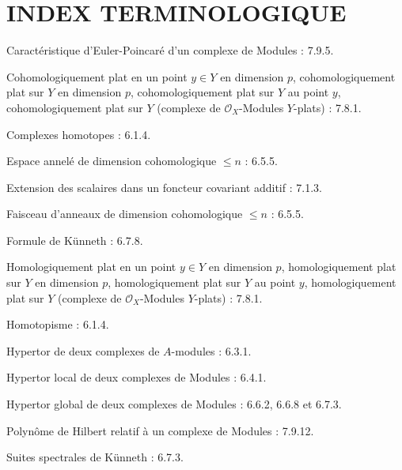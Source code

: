 \section*{INDEX TERMINOLOGIQUE}

\begin{flushleft}
Caractéristique d'Euler-Poincaré d'un complexe de Modules : 7.9.5.

\medskip
Cohomologiquement plat en un point $y\in Y$ en dimension $p$,
cohomologiquement plat sur $Y$ en dimension $p$, cohomologiquement plat sur
$Y$ au point $y$, cohomologiquement plat sur $Y$ (complexe de
$\mathscr O_X$-Modules $Y$-plats) : 7.8.1.

\medskip
Complexes homotopes : 6.1.4.

\medskip
Espace annelé de dimension cohomologique $\leq n$ : 6.5.5.

\medskip
Extension des scalaires dans un foncteur covariant additif : 7.1.3.

\medskip
Faisceau d'anneaux de dimension cohomologique $\leq n$ : 6.5.5.

\medskip
Formule de Künneth : 6.7.8.

\medskip
Homologiquement plat en un point $y\in Y$ en dimension $p$,
homologiquement plat sur $Y$ en dimension $p$, homologiquement plat sur $Y$
au point $y$, homologiquement plat sur $Y$ (complexe de $\mathscr O_X$-Modules
$Y$-plats) : 7.8.1.

\medskip
Homotopisme : 6.1.4.

\medskip
Hypertor de deux complexes de $A$-modules : 6.3.1.

\medskip
Hypertor local de deux complexes de Modules : 6.4.1.

\medskip
Hypertor global de deux complexes de Modules : 6.6.2, 6.6.8 et 6.7.3.

\medskip
Polynôme de Hilbert relatif à un complexe de Modules : 7.9.12.

\medskip
Suites spectrales de Künneth : 6.7.3.
\end{flushleft}

\clearpage
